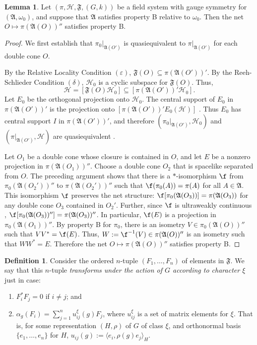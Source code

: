 \documentclass[12pt]{article}
\newcommand{\alg}[1]{\mathfrak{#1}}
\theoremstyle{definition}
\newtheorem{lemma}[thm]{Lemma}
\theoremstyle{definition}
\newtheorem{defn}[thm]{Definition}
\theoremstyle{remark}
\newcommand{\ve}{\varepsilon}
\def\2#1{{\mathcal #1}}
\def\al#1{{\mathfrak #1}}
\def\a{\alpha} \def\b{\beta} \def\g{\gamma} \def\d{\delta}
\def\om{\omega} \def\Om{\Omega} \def\dd{\partial} \def\D{\Delta}
\newcommand{\fields}{(\pi ,\2H ,\alg{F},(G,k))}
\begin{document}
\begin{lemma} Let $\fields$ be a field system with
  gauge symmetry for $(\al A,\om _0)$, and suppose that
  $\al A$ satisfies property B relative to $\om _0$.
  Then the net $O\mapsto \pi (\alg{A}(O))''$ satisfies
  property B.  \label{BB}
\end{lemma}

\begin{proof} We first establish that $\pi
  _0|_{\alg{A}(O')}$ is quasiequivalent to $\pi
  |_{\alg{A}(O')}$ for each double cone $O$.

  By the Relative Locality Condition $(\ve )$, $\al
  F(O)\subseteq \pi (\al A(O'))'$.  By the
  Reeh-Schlieder Condition $(\d )$, $\2H _0$ is a
  cyclic subspace for $\al F(O)$.  Thus,
$$ \2H =[\al F(O)\2H _0]\subseteq [\pi (\al A(O'))'\2H _0] .$$
Let $E_0$ be the orthogonal projection onto $\2H _0$.  The central
support of $E_0$ in $\pi (\al A(O'))'$ is the projection onto
$[\pi(\alg{A}(O'))'E_0(\2H )]$ \cite[Prop.\ 5.5.2]{kr}.  Thus $E_0$
has central support $I$ in $\pi (\al A(O'))'$, and therefore $(\pi
_0|_{\al A(O')},\2H _0)$ and $(\pi |_{\al A(O')},\2H )$ are
quasiequivalent \cite[Thm.\ 10.3.3]{kr}.

Let $O_1$ be a double cone whose closure is contained in $O$, and let
$E$ be a nonzero projection in $\pi (\alg{A}(O_1))''$.  Choose a
double cone $O_2$ that is spacelike separated from $O$.  The
preceding argument shows that there is a $*$-isomorphism $\f$ from
$\pi _0(\alg{A}(O_2'))''$ to $\pi (\alg{A}(O_2'))''$ such that $\f
(\pi _0(A))=\pi (A)$ for all $A\in \alg{A}$.  This isomorphism $\f$
preserves the net structure: $\f [\pi _0(\alg{A}(O_3))]=\pi
(\alg{A}(O_3))$ for any double cone $O_3$ contained in $O_2'$.
Further, since $\f$ is ultraweakly continuous \cite[Cor.\ 7.1.16]{kr},
$\f [\pi _0(\alg{A}(O_3))'']=\pi (\alg{A}(O_3))''$.  In particular,
$\f (E)$ is a projection in $\pi _0 (\alg{A}(O_1))''$.  By property B
for $\pi _0$, there is an isometry $V\in \pi _0(\alg{A}(O))''$ such
that $VV^*=\f (E)$.  Thus, $W:=\f ^{-1}(V)\in \pi (\alg{A}(O))''$ is
an isometry such that $WW^*=E$.  Therefore the net $O\mapsto \pi
(\alg{A}(O))''$ satisfies property B.
\end{proof}

\begin{defn} Consider the ordered $n$-tuple $(F_1,\dots ,F_n)$ of
  elements in $\alg{F}$.  We say that this $n$-tuple \emph{transforms
    under the action of $G$ according to character $\xi$} just in
  case:
  \begin{enumerate}
\item $F_{i}^*F_j=0$ if $i\neq j$; and 
\item $\a _g(F_i) =\sum _{j=1}^{n}u^{\xi}_{ij}(g)F_{j}$, where
  $u^{\xi}_{ij}$ is a set of matrix elements for $\xi$.  That
  is, for some representation $(H,\rho )$ of $G$ of class $\xi$,
  and orthonormal basis $\{ e_1,\dots ,e_n\}$ for $H$,
  $u_{ij}(g):=\langle e_{i},\rho (g)e_j\rangle _{H}$.
\end{enumerate}
\end{defn}
\end{document}
